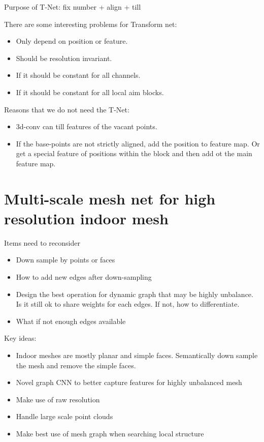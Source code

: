 \documentclass[,table,dvipsnames]{article}
\begin{document}
Purpose of T-Net: fix number + align + till \par
There are some interesting problems for Transform net:
\begin{itemize}
	\item Only depend on position or feature.
	\item Should be resolution invariant.
	\item If it should be constant for all channels.
	\item If it should be constant for all local aim blocks.
\end{itemize}
\par
Reasons that we do not need the T-Net:
\begin{itemize}
	\item 3d-conv can till features of the vacant points.
	\item If the base-points are not strictly aligned, add the position to feature map. Or get a special feature of positions within the block and then add ot the main feature map.
\end{itemize}
\par
{}

\newpage
\section{Multi-scale mesh net for high resolution indoor mesh}
Items need to reconsider
\begin{itemize}
	\item Down sample by points or faces
	\item How to add new edges after down-sampling
	\item Design the best operation for dynamic graph that may be highly unbalance. Is it still ok to share weights for each edges. If not, how to differentiate.
	\item What if not enough edges available
\end{itemize}

\par \noindent
Key ideas:
\begin{itemize}
	\item Indoor meshes are mostly planar and simple faces. Semantically down sample the mesh and remove the simple faces.
	\item Novel graph CNN to better capture features for highly unbalanced mesh 
	\item Make use of raw resolution
	\item Handle large scale point clouds
	\item Make best use of mesh graph when searching local structure
\end{itemize}
\end{document}
